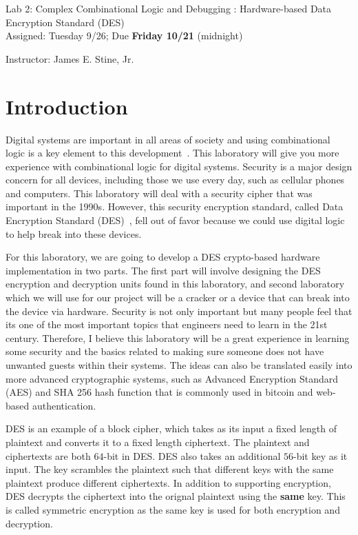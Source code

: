 \documentclass{article}
\newcommand{\myassignment}{Lab 2: Complex Combinational Logic and Debugging : Hardware-based Data Encryption Standard (DES)}
\newcommand{\myduedate}{Assigned: Tuesday 9/26; Due \textbf{Friday 10/21} (midnight)}
\newcommand{\myinstructor}{Instructor: James E. Stine, Jr.}
\begin{document}
\begin{center}
  {\huge \myassignment} \\
  {\large \myduedate} \\
  \begin{flushright}
  \myinstructor \\
  \end{flushright}
\end{center}

\section{Introduction}

Digital systems are important in all areas of society and using
combinational logic is a key element to this
development~\cite{ddca-riscv}.  This
laboratory will give you more experience with combinational logic
for digital systems.  
Security is a major design concern for all devices, including those  we
use every day, such as cellular phones and computers.
This laboratory will deal with a security cipher that was important in
the 1990s.  However, this security encryption standard, called Data
Encryption Standard (DES)~\cite{fips463, Biryukov2005}, fell out of
favor because we
could use
digital logic to help break into these devices.

For this laboratory, we are going to develop a DES crypto-based
hardware implementation
in two parts.  The first part will involve designing the
DES encryption and decryption units found in this laboratory,
and second laboratory which we will
use for our project will be a cracker or a
device that can break into the device via hardware.
Security is not only important but many people feel that its one of the most important
topics that engineers
need to learn in the 21st century.  Therefore, I
believe this laboratory will be a great experience in learning some
security and the basics related to making sure someone does not have
unwanted guests within their systems.  The ideas can also be
translated easily into more advanced cryptographic systems, such as
Advanced Encryption Standard (AES) and SHA 256 hash function that is
commonly used in bitcoin and web-based authentication.

DES is an example of a block cipher, which takes as its input a fixed
length of plaintext and converts it to a fixed length ciphertext.
The plaintext and ciphertexts are both $64$-bit in DES.  DES also
takes an additional $56$-bit key as it input.  The key scrambles the
plaintext such that different keys with the same plaintext produce
different ciphertexts.  In addition to supporting encryption,
DES decrypts the ciphertext into the orignal plaintext using the \textbf{same}
key.  This is called symmetric encryption as the same key is used
for both encryption and decryption.
\end{document}
